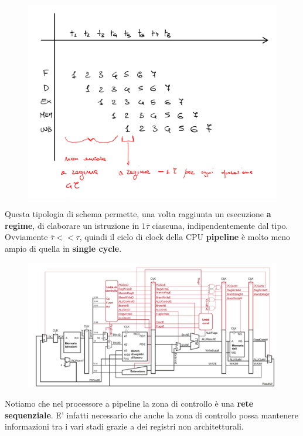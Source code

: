 \documentclass{article}
\begin{document}
\begin{figure}[htbp]
        \center
        \includegraphics[scale=0.6]{img/pipeline_senza_dip.png}
    \end{figure}

Questa tipologia di schema permette, una volta raggiunta un esecuzione \textbf{a regime}, di elaborare un istruzione in $1\overline{\tau}$ ciascuna, indipendentemente dal tipo. Ovviamente $\overline{\tau} << \tau$, quindi il ciclo di clock della CPU \textbf{pipeline} è molto meno ampio di quella in \textbf{single cycle}.

    \begin{figure}[htbp]
        \center
        \includegraphics[scale=0.375]{img/implementazione_pipeline.png}
    \end{figure}

Notiamo che nel processore a pipeline la zona di controllo è una \textbf{rete sequenziale}. E' infatti necessario che anche la zona di controllo possa mantenere informazioni tra i vari stadi grazie a dei registri non architetturali.
\end{document}
